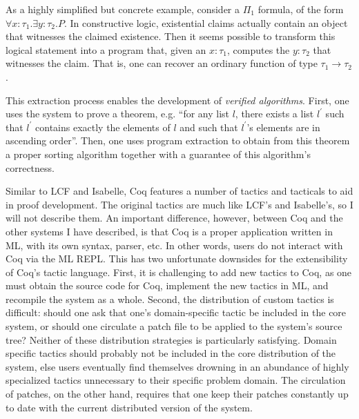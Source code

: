 
As a highly simplified but concrete example, consider a $\Pi_1$ formula, of the
form $\forall x{:}\tau_1.\exists y{:}\tau_2.P$.
In constructive logic, existential claims actually contain an object that
witnesses the claimed existence.
Then it seems possible to transform this logical statement into a program that,
given an $x{:}\tau_1$, computes the $y{:}\tau_2$ that witnesses the claim.
That is, one can recover an ordinary function of type $\tau_1 \to \tau_2$.

This extraction process enables the development of \emph{verified algorithms}.
First, one uses the system to prove a theorem, e.g. ``for any list $l$, there
exists a list $l^\prime$ such that $l^\prime$ contains exactly the elements of
$l$ and such that $l^\prime$'s elements are in ascending order''.
Then, one uses program extraction to obtain from this theorem a proper sorting
algorithm together with a guarantee of this algorithm's correctness.

Similar to LCF and Isabelle, Coq features a number of tactics and tacticals to
aid in proof development.
The original tactics are much like LCF's and Isabelle's, so I will not describe
them.
An important difference, however, between Coq and the other systems I have
described, is that Coq is a proper application written in ML\footnotemark,
with its own syntax, parser, etc.
%
%
In other words, users do not interact with Coq via the ML REPL.
This has two unfortunate downsides for the extensibility of Coq's tactic
language.
First, it is challenging to add new tactics to Coq, as one must obtain the
source code for Coq, implement the new tactics in ML, and recompile the system
as a whole.
Second, the distribution of custom tactics is difficult: should one ask that
one's domain-specific tactic be included in the core system, or should one
circulate a patch file to be applied to the system's source tree?
Neither of these distribution strategies is particularly satisfying.
Domain specific tactics should probably not be included in the core distribution
of the system, else users eventually find themselves drowning in an abundance of
highly specialized tactics unnecessary to their specific problem domain.
The circulation of patches, on the other hand, requires that one keep their
patches constantly up to date with the current distributed version of the
system.

